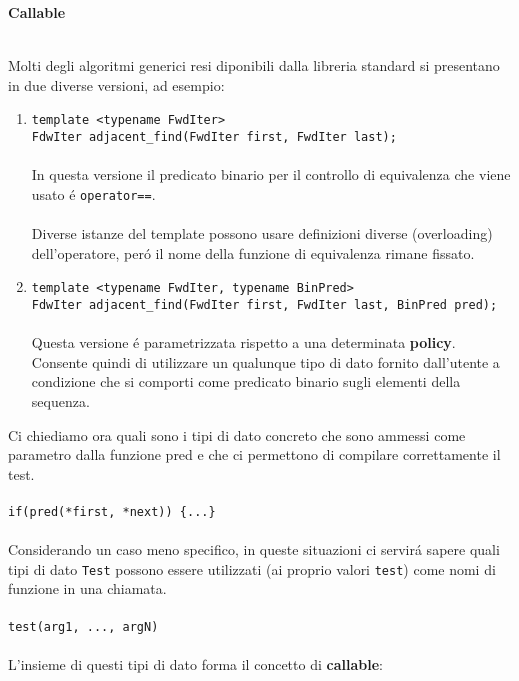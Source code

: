 \documentclass{article}
\begin{document}
\\ \\ \\ \\ \\
\begin{large} \textbf{\textcolor{blu}{Callable}}\\ \\ \end{large}
Molti degli algoritmi generici resi diponibili dalla libreria standard si presentano in due diverse versioni, ad esempio:\\
\begin{enumerate}
\item \texttt{template <typename FwdIter>\\FdwIter adjacent\_find(FwdIter first, FwdIter last);}\\ \\In questa versione il predicato binario per il controllo di equivalenza che viene usato \'e \texttt{operator==}.\\ \\Diverse istanze del template possono usare definizioni diverse (overloading) dell'operatore, per\'o il nome della funzione di equivalenza rimane fissato.\\
\item \texttt{template <typename FwdIter, typename BinPred>\\FdwIter adjacent\_find(FwdIter first, FwdIter last, BinPred pred);}\\ \\Questa versione \'e parametrizzata rispetto a una determinata \textbf{policy}.\\Consente quindi di utilizzare un qualunque tipo di dato fornito dall'utente a condizione che si comporti come predicato binario sugli elementi della sequenza. \\
\end{enumerate}
Ci chiediamo ora quali sono i tipi di dato concreto che sono ammessi come parametro dalla funzione pred e che ci permettono di compilare correttamente il test.\\ \\ \texttt{if(pred(*first, *next)) \{...\} } \\ \\ Considerando un caso meno specifico, in queste situazioni ci servir\'a sapere quali tipi di dato \texttt{Test} possono essere utilizzati (ai proprio valori \texttt{test}) come nomi di funzione in una chiamata. \\ \\ \texttt{test(arg1, ..., argN)} \\ \\ L'insieme di questi tipi di dato forma il concetto di \textbf{callable}:
\end{document}
